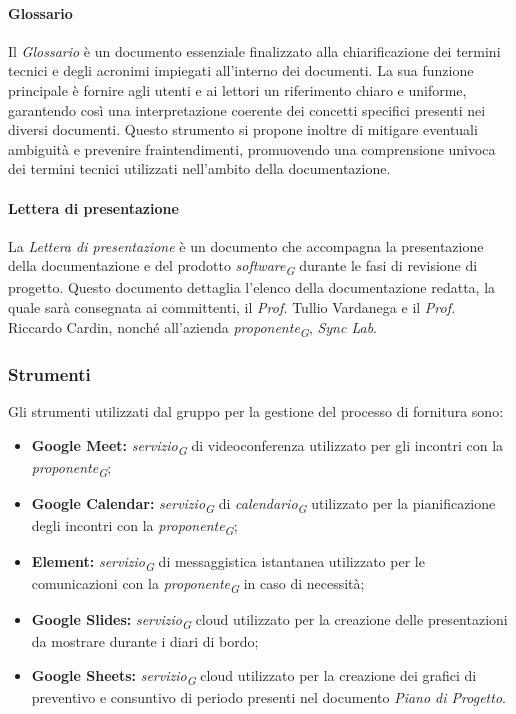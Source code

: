 \paragraph{Glossario}
Il \textit{Glossario} è un documento essenziale finalizzato alla chiarificazione dei termini tecnici e degli acronimi impiegati all'interno dei documenti. La sua funzione principale è fornire agli utenti e ai lettori un riferimento chiaro e uniforme, garantendo così una interpretazione coerente dei concetti specifici presenti nei diversi documenti. Questo strumento si propone inoltre di mitigare eventuali ambiguità e prevenire fraintendimenti, promuovendo una comprensione univoca dei termini tecnici utilizzati nell'ambito della documentazione.

\paragraph{Lettera di presentazione}
La \textit{Lettera di presentazione} è un documento che accompagna la presentazione della documentazione e del prodotto \textit{software}\textsubscript{\textit{G}} durante le fasi di revisione di progetto. Questo documento dettaglia l'elenco della documentazione redatta, la quale sarà consegnata ai committenti, il \textit{Prof.} Tullio Vardanega e il \textit{Prof.} Riccardo Cardin, nonché all'azienda \textit{proponente}\textsubscript{\textit{G}}, \textit{Sync Lab}.

\subsubsection{Strumenti}
Gli strumenti utilizzati dal gruppo per la gestione del processo di fornitura sono: 
\begin{itemize}
    \item \textbf{Google Meet:}
    \textit{servizio}\textsubscript{\textit{G}} di videoconferenza utilizzato per gli incontri con la \textit{proponente}\textsubscript{\textit{G}};
    \item \textbf{Google Calendar:}
    \textit{servizio}\textsubscript{\textit{G}} di \textit{calendario}\textsubscript{\textit{G}} utilizzato per la pianificazione degli incontri con la \textit{proponente}\textsubscript{\textit{G}};
    \item \textbf{Element:}
    \textit{servizio}\textsubscript{\textit{G}} di messaggistica istantanea utilizzato per le comunicazioni con la \textit{proponente}\textsubscript{\textit{G}} in caso di necessità;
    \item \textbf{Google Slides:}
    \textit{servizio}\textsubscript{\textit{G}} cloud utilizzato per la creazione delle presentazioni da mostrare durante i diari di bordo;
    \item \textbf{Google Sheets:} \textit{servizio}\textsubscript{\textit{G}} cloud utilizzato per la creazione dei grafici di preventivo e consuntivo di periodo presenti nel documento \textit{Piano di Progetto}.
\end{itemize}

